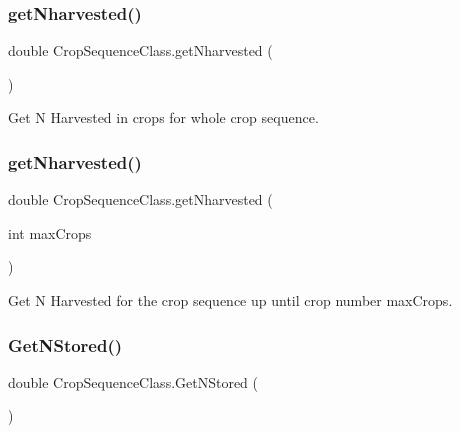 \subsubsection{\texorpdfstring{getNharvested()}{getNharvested()}\hspace{0.1cm}{\footnotesize\ttfamily [1/2]}}
{\footnotesize\ttfamily double Crop\+Sequence\+Class.\+get\+Nharvested (\begin{DoxyParamCaption}{ }\end{DoxyParamCaption})\hspace{0.3cm}{\ttfamily [inline]}}



Get N Harvested in crops for whole crop sequence. 

\mbox{\label{class_crop_sequence_class_a382d9bf27f83833304ded5881aeb5534}} 
\subsubsection{\texorpdfstring{getNharvested()}{getNharvested()}\hspace{0.1cm}{\footnotesize\ttfamily [2/2]}}
{\footnotesize\ttfamily double Crop\+Sequence\+Class.\+get\+Nharvested (\begin{DoxyParamCaption}\item[{int}]{max\+Crops }\end{DoxyParamCaption})\hspace{0.3cm}{\ttfamily [inline]}}



Get N Harvested for the crop sequence up until crop number max\+Crops. 

\mbox{\label{class_crop_sequence_class_ad9a5c0b00669854a028bdf5e683c4e17}} 
\subsubsection{\texorpdfstring{GetNStored()}{GetNStored()}}
{\footnotesize\ttfamily double Crop\+Sequence\+Class.\+Get\+N\+Stored (\begin{DoxyParamCaption}{ }\end{DoxyParamCaption})\hspace{0.3cm}{\ttfamily [inline]}}



